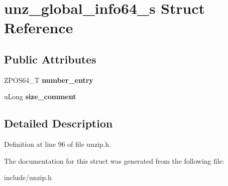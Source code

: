 \hypertarget{structunz__global__info64__s}{\section{unz\-\_\-global\-\_\-info64\-\_\-s Struct Reference}
\label{structunz__global__info64__s}
}
\subsection*{Public Attributes}
\begin{DoxyCompactItemize}
\item 
\hypertarget{structunz__global__info64__s_a628f94ac445f2a6cd64c9e82d481e738}{Z\-P\-O\-S64\-\_\-\-T {\bfseries number\-\_\-entry}}\label{structunz__global__info64__s_a628f94ac445f2a6cd64c9e82d481e738}

\item 
\hypertarget{structunz__global__info64__s_ad9440fb3b019cfdac9ba8b8d83026ffc}{u\-Long {\bfseries size\-\_\-comment}}\label{structunz__global__info64__s_ad9440fb3b019cfdac9ba8b8d83026ffc}

\end{DoxyCompactItemize}


\subsection{Detailed Description}


Definition at line 96 of file unzip.\-h.



The documentation for this struct was generated from the following file\-:\begin{DoxyCompactItemize}
\item 
include/unzip.\-h\end{DoxyCompactItemize}
